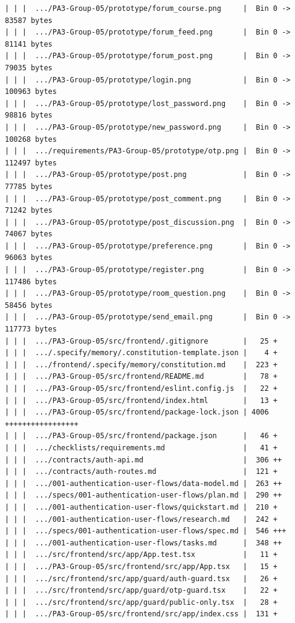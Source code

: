 \documentclass[12pt]{article}
\begin{document}
\begin{lstlisting}[numbers=none,breaklines=true]
| | |  .../PA3-Group-05/prototype/forum_course.png     |  Bin 0 -> 83587 bytes
| | |  .../PA3-Group-05/prototype/forum_feed.png       |  Bin 0 -> 81141 bytes
| | |  .../PA3-Group-05/prototype/forum_post.png       |  Bin 0 -> 79035 bytes
| | |  .../PA3-Group-05/prototype/login.png            |  Bin 0 -> 100963 bytes
| | |  .../PA3-Group-05/prototype/lost_password.png    |  Bin 0 -> 98816 bytes
| | |  .../PA3-Group-05/prototype/new_password.png     |  Bin 0 -> 100268 bytes
| | |  .../requirements/PA3-Group-05/prototype/otp.png |  Bin 0 -> 112497 bytes
| | |  .../PA3-Group-05/prototype/post.png             |  Bin 0 -> 77785 bytes
| | |  .../PA3-Group-05/prototype/post_comment.png     |  Bin 0 -> 71242 bytes
| | |  .../PA3-Group-05/prototype/post_discussion.png  |  Bin 0 -> 74067 bytes
| | |  .../PA3-Group-05/prototype/preference.png       |  Bin 0 -> 96063 bytes
| | |  .../PA3-Group-05/prototype/register.png         |  Bin 0 -> 117486 bytes
| | |  .../PA3-Group-05/prototype/room_question.png    |  Bin 0 -> 58456 bytes
| | |  .../PA3-Group-05/prototype/send_email.png       |  Bin 0 -> 117773 bytes
| | |  .../PA3-Group-05/src/frontend/.gitignore        |   25 +
| | |  .../.specify/memory/.constitution-template.json |    4 +
| | |  .../frontend/.specify/memory/constitution.md    |  223 +
| | |  .../PA3-Group-05/src/frontend/README.md         |   78 +
| | |  .../PA3-Group-05/src/frontend/eslint.config.js  |   22 +
| | |  .../PA3-Group-05/src/frontend/index.html        |   13 +
| | |  .../PA3-Group-05/src/frontend/package-lock.json | 4006 +++++++++++++++++
| | |  .../PA3-Group-05/src/frontend/package.json      |   46 +
| | |  .../checklists/requirements.md                  |   41 +
| | |  .../contracts/auth-api.md                       |  306 ++
| | |  .../contracts/auth-routes.md                    |  121 +
| | |  .../001-authentication-user-flows/data-model.md |  263 ++
| | |  .../specs/001-authentication-user-flows/plan.md |  290 ++
| | |  .../001-authentication-user-flows/quickstart.md |  210 +
| | |  .../001-authentication-user-flows/research.md   |  242 +
| | |  .../specs/001-authentication-user-flows/spec.md |  546 +++
| | |  .../001-authentication-user-flows/tasks.md      |  348 ++
| | |  .../src/frontend/src/app/App.test.tsx           |   11 +
| | |  .../PA3-Group-05/src/frontend/src/app/App.tsx   |   15 +
| | |  .../src/frontend/src/app/guard/auth-guard.tsx   |   26 +
| | |  .../src/frontend/src/app/guard/otp-guard.tsx    |   22 +
| | |  .../src/frontend/src/app/guard/public-only.tsx  |   28 +
| | |  .../PA3-Group-05/src/frontend/src/app/index.css |  131 +

\end{lstlisting}
\end{document}
